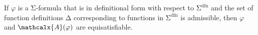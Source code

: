 \documentclass[runningheads,a4paper]{llncs}
\newcommand\DDD{\Delta}
\let\oldSigma=\Sigma
\def\Sigma{\mathrm{\oldSigma}}
\let\oldDelta=\Delta
\def\Delta{\mathrm{\oldDelta}}
\newcommand{\conv}{\mathcalx{A}}
\newcommand{\sfundefs}[1]{#1^\mathrm{dfn}}
\begin{document}

\begin{theorem}\label{thm:equi}
If $\varphi$ is a\/ $\Sigma$-formula that is in definitional form with respect to\/
$\sfundefs{\Sigma}$
and the set of function definitions\/ $\DDD$ corresponding to functions in
$\sfundefs{\Sigma}$ is admissible, then\/ $\varphi$ and\/ $\conv( \varphi )$ are
equisatisfiable.
\end{theorem}
\end{document}
